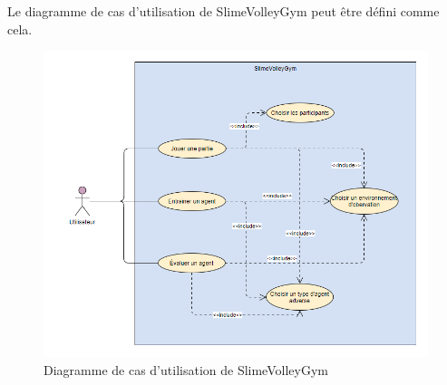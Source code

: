 \documentclass[11pt, a4paper]{article}
\begin{document}
Le diagramme de cas d'utilisation de SlimeVolleyGym peut être défini comme cela.
 \begin{figure}[H]
    \centering
    \includegraphics[scale=0.7]{images/cas_utilisation.PNG}
    \caption {Diagramme de cas d'utilisation de SlimeVolleyGym}
\end{figure}
\end{document}

